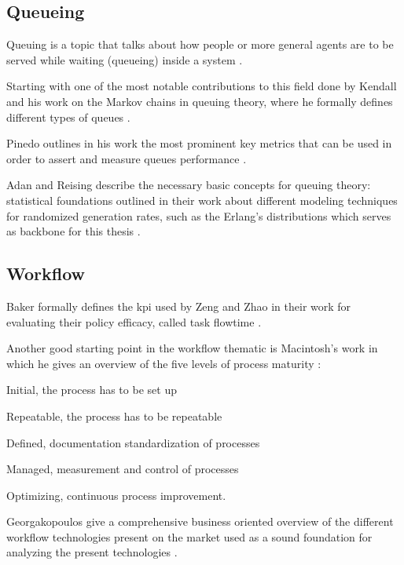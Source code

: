 \documentclass{seal_thesis}
\begin{document}
\subsection{Queueing}

Queuing is a topic that talks about how people or more general agents are to be served while waiting (\ie queueing) inside a system \cite{Kendall1953}.

Starting with one of the most notable contributions to this field done by Kendall and his work on the Markov chains in queuing theory, where he formally defines different types of queues \cite{Kendall1953}.

Pinedo outlines in his work the most prominent key metrics that can be used in order to assert and measure queues performance \cite{Pinedo2008}.

Adan and Reising describe the necessary basic concepts for queuing theory: statistical foundations outlined in their work about different modeling techniques for randomized generation rates, such as the Erlang's distributions which serves as backbone for this thesis \cite{Adan2016}.

\subsection{Workflow}
\label{subsec:workflow}

Baker formally defines the \gls{kpi} used by Zeng and Zhao in their work for evaluating their policy efficacy, called task flowtime \cite{Baker1974}.

Another good starting point in the workflow thematic is Macintosh's work in which he gives an overview of the five levels of process maturity \cite{Macintosh1993}:
\begin{enumerate*}
	\item Initial, the process has to be set up
	\item Repeatable, the process has to be repeatable
	\item Defined, documentation standardization of processes
	\item Managed, measurement and control of processes
	\item Optimizing, continuous process improvement.
\end{enumerate*}

Georgakopoulos \etal give a comprehensive business oriented overview of the different workflow technologies present on the market used as a sound foundation for analyzing the present technologies \cite{Georgakopoulos1995}.
\end{document}
